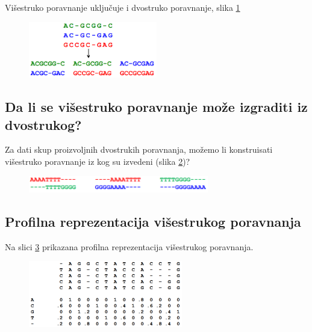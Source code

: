 Višestruko poravnanje uključuje i dvostruko poravnanje, slika \ref{slika:visestrukoDvostruko}

\begin{figure}[h!]
\centering
\includegraphics[width=0.5\textwidth]{poglavlja/5/slike/visestrukoDvostruko.png}
\caption{}
\label{slika:visestrukoDvostruko}
\end{figure}

\subsection{Da li se višestruko poravnanje može izgraditi iz dvostrukog?}
Za dati skup proizvoljnih dvostrukih poravnanja, možemo li konstruisati višestruko poravnanje iz kog su izvedeni (slika \ref{slika:dvostruka})?

\begin{figure}[h!]
\centering
\includegraphics[width=0.7\textwidth]{poglavlja/5/slike/dvostruka.png}
\caption{}
\label{slika:dvostruka}
\end{figure}

\subsection{Profilna reprezentacija višestrukog poravnanja}

Na slici \ref{slika:profilVisetruko} prikazana profilna reprezentacija višestrukog poravnanja.
\begin{figure}[h!]
\centering
\includegraphics[width=0.6\textwidth]{poglavlja/5/slike/profilVisestruko.png}
\caption{}
\label{slika:profilVisetruko}
\end{figure}


